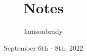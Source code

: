 \usepackage[utf8]{inputenc}

\title{Notes}
\author{lamsonbrady }
\date{September 6th - 8th, 2022}

\usepackage{parskip}

\usepackage{fancyhdr}
\pagestyle{fancy}

\usepackage{amsmath}
\usepackage{amssymb}

\newcommand{\psmall}[1]{
\left(\begin{smallmatrix}
#1
\end{smallmatrix} \right)
}

\newcommand{\bb}{\mathbb}
\newcommand{\R}{\mathbb{R}}
\renewcommand{\P}{\mathbb{P}}
\newcommand{\Z}{\mathbb{Z}}

\newcommand{\genericvec}{
	\ensuremath{
		\left\{\vec{e_1}, \vec{e_2}, \dots, \vec{e_n} \right\}
	}
}
